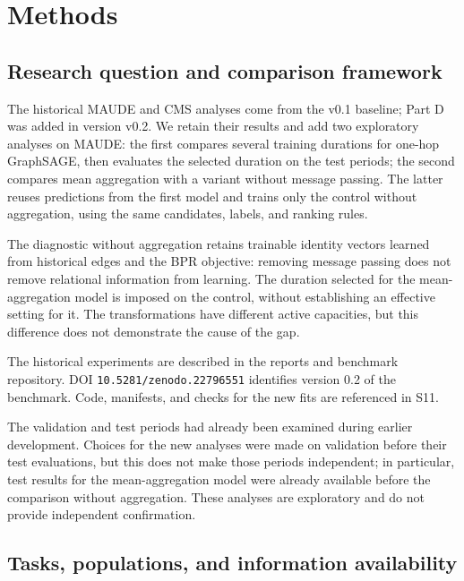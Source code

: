\section{Methods}
\label{sec:methods}

\subsection{Research question and comparison framework}

The historical MAUDE and CMS analyses come from the v0.1 baseline; Part D was added in version v0.2. We retain their results and add two exploratory analyses on MAUDE: the first compares several training durations for one-hop GraphSAGE, then evaluates the selected duration on the test periods; the second compares mean aggregation with a variant without message passing. The latter reuses predictions from the first model and trains only the control without aggregation, using the same candidates, labels, and ranking rules.

The diagnostic without aggregation retains trainable identity vectors learned from historical edges and the BPR objective: removing message passing does not remove relational information from learning. The duration selected for the mean-aggregation model is imposed on the control, without establishing an effective setting for it. The transformations have different active capacities, but this difference does not demonstrate the cause of the gap.

The historical experiments are described in the reports and benchmark repository\cite{hgb2026,hgbcontract,hgbresults,hgbpartd,hgbanalysis,hgbcode}. DOI \nolinkurl{10.5281/zenodo.22796551} identifies version 0.2 of the benchmark. Code, manifests, and checks for the new fits are referenced in S11.

The validation and test periods had already been examined during earlier development. Choices for the new analyses were made on validation before their test evaluations, but this does not make those periods independent; in particular, test results for the mean-aggregation model were already available before the comparison without aggregation. These analyses are exploratory and do not provide independent confirmation.

\subsection{Tasks, populations, and information availability}
\label{sec:tasks}

